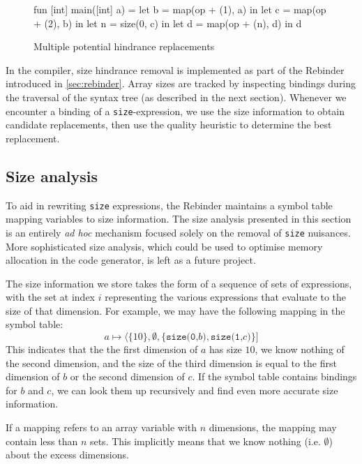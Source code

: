 \begin{figure}
\begin{center}
\begin{bcolorcode}
fun [int] main([int] a) =
  let b = map(op + (1), a) in
  let c = map(op + (2), b) in
  let n = size(0, c) in
  let d = map(op + (n), d) in
  d
\end{bcolorcode}
\end{center}
\caption{Multiple potential hindrance replacements}
\label{fig:multiple-replacements}
\end{figure}

In the \LO{} compiler, size hindrance removal is implemented as part
of the Rebinder introduced in \cref{sec:rebinder}.  Array sizes are
tracked by inspecting bindings during the traversal of the syntax tree
(as described in the next section).  Whenever we encounter a binding
of a \texttt{size}-expression, we use the size information to obtain
candidate replacements, then use the quality heuristic to determine
the best replacement.

\subsection{Size analysis}
\label{sec:size-analysis}

To aid in rewriting \texttt{size} expressions, the Rebinder maintains
a symbol table mapping variables to size information.  The size
analysis presented in this section is an entirely \textit{ad hoc}
mechanism focused solely on the removal of \texttt{size} nuisances.
More sophisticated size analysis, which could be used to optimise
memory allocation in the code generator, is left as a future project.

The size information we store takes the form of a sequence of sets of
expressions, with the set at index $i$ representing the various
expressions that evaluate to the size of that dimension.  For example,
we may have the following mapping in the symbol table:
\[
a \mapsto \langle\{10\}, \emptyset, \{\texttt{size(0,$b$)}, \texttt{size(1,$c$)}\}]
\]
This indicates that the the first dimension of $a$ has size $10$, we
know nothing of the second dimension, and the size of the third
dimension is equal to the first dimension of $b$ or the second
dimension of $c$.  If the symbol table contains bindings for $b$ and
$c$, we can look them up recursively and find even more accurate size
information.

If a mapping refers to an array variable with $n$ dimensions, the
mapping may contain less than $n$ sets.  This implicitly means that we
know nothing (i.e. $\emptyset$) about the excess dimensions.

